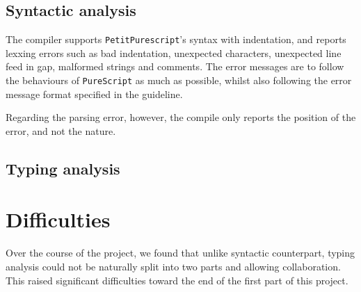 \documentclass{amsart}
\begin{document}
	\subsection{Syntactic analysis}
	
	The compiler supports \texttt{PetitPurescript}'s syntax with indentation, and reports lexxing errors such as bad indentation, unexpected characters, unexpected line feed in gap, malformed strings and comments. The error messages are to follow the behaviours of \texttt{PureScript} as much as possible, whilst also following the error message format specified in the guideline.
	
	Regarding the parsing error, however, the compile only reports the position of the error, and not the nature.
	
	\subsection{Typing analysis}
	
	\section{Difficulties}
	
	Over the course of the project, we found that unlike syntactic counterpart, typing analysis could not be naturally split into two parts and allowing collaboration. This raised significant difficulties toward the end of the first part of this project.
	
\end{document}
